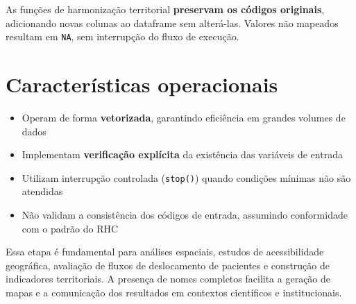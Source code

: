 \documentclass[
  brazilian,
  a4paper,
  oneside]{scrbook}
\providecommand{\tightlist}{%
  \setlength{\itemsep}{0pt}\setlength{\parskip}{0pt}}
\begin{document}
\begin{tcolorbox}[enhanced jigsaw, arc=.35mm, bottomrule=.15mm, bottomtitle=1mm, breakable, colback=white, colbacktitle=quarto-callout-note-color!10!white, colframe=quarto-callout-note-color-frame, coltitle=black, left=2mm, leftrule=.75mm, opacityback=0, opacitybacktitle=0.6, rightrule=.15mm, title=\textcolor{quarto-callout-note-color}{\faInfo}\hspace{0.5em}{Preservação das variáveis originais}, titlerule=0mm, toprule=.15mm, toptitle=1mm]

As funções de harmonização territorial \textbf{preservam os códigos
originais}, adicionando novas colunas ao dataframe sem alterá-las.
Valores não mapeados resultam em \texttt{NA}, sem interrupção do fluxo
de execução.

\end{tcolorbox}

\section{Características
operacionais}\label{caracteruxedsticas-operacionais}

\begin{itemize}
\tightlist
\item
  Operam de forma \textbf{vetorizada}, garantindo eficiência em grandes
  volumes de dados
\item
  Implementam \textbf{verificação explícita} da existência das variáveis
  de entrada
\item
  Utilizam interrupção controlada (\texttt{stop()}) quando condições
  mínimas não são atendidas
\item
  Não validam a consistência dos códigos de entrada, assumindo
  conformidade com o padrão do RHC
\end{itemize}

\begin{tcolorbox}[enhanced jigsaw, arc=.35mm, bottomrule=.15mm, bottomtitle=1mm, breakable, colback=white, colbacktitle=quarto-callout-tip-color!10!white, colframe=quarto-callout-tip-color-frame, coltitle=black, left=2mm, leftrule=.75mm, opacityback=0, opacitybacktitle=0.6, rightrule=.15mm, title=\textcolor{quarto-callout-tip-color}{\faLightbulb}\hspace{0.5em}{Aplicações analíticas}, titlerule=0mm, toprule=.15mm, toptitle=1mm]

Essa etapa é fundamental para análises espaciais, estudos de
acessibilidade geográfica, avaliação de fluxos de deslocamento de
pacientes e construção de indicadores territoriais. A presença de nomes
completos facilita a geração de mapas e a comunicação dos resultados em
contextos científicos e institucionais.

\end{tcolorbox}
\end{document}
